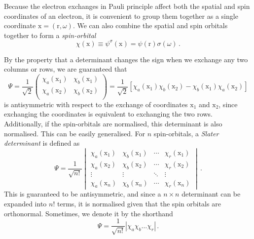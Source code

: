 \documentclass{article}
\theoremstyle{plain}\theoremheaderfont{\normalfont\itshape}\theorembodyfont{\rmfamily}\theoremseparator{.}\newtheorem*{rem}{Remark}\newtheorem*{ex}{Example}\newtheorem*{proof}{Proof}\newtheorem*{altp}{Alternative proof}
\theoremstyle{plain}\theoremheaderfont{\normalfont\bfseries}\theorembodyfont{\rmfamily}\theoremseparator{.}\newtheorem{thm}{Theorem}[section]\newtheorem{lem}[thm]{Lemma}\newtheorem{prop}[thm]{Proposition}\newtheorem*{cor}{Corollary}\newtheorem{defn}[thm]{Definition}\newtheorem{clm}[thm]{Claim}\newtheorem{clminproof}{Claim}\newtheorem{pos}{Postulate}[section]
\theoremstyle{break}\theoremheaderfont{\normalfont\itshape}\theorembodyfont{\rmfamily}\theoremseparator{.\medskip}\newtheorem*{proofskip}{Proof}\newtheorem*{exs}{Examples}\newtheorem*{rems}{Remarks}
\theoremstyle{break}\theoremheaderfont{\normalfont\bfseries}\theorembodyfont{\rmfamily}\theoremseparator{.\medskip}\newtheorem{lemskip}[thm]{Lemma}\newtheorem{defnskip}[thm]{Definition}\newtheorem{propskip}[thm]{Proposition}\newtheorem{thmskip}[thm]{Theorem}
\numberwithin{equation}{section}
\newcommand{\vb}[1]{\bm{\mathrm{#1}}}
\newcommand{\abs}[1]{\left| #1 \right|}
\begin{document}
    Because the electron exchanges in Pauli principle affect both the spatial and spin coordinates of an electron, it is convenient to group them together as a single coordinate \(\vb{x}=(\vb{r},\omega)\). We can also combine the spatial and spin orbitals together to form a \textit{spin-orbital}
    \begin{equation}
        \chi(\vb{x})\equiv\psi^{\sigma}(\vb{x})=\psi(\vb{r})\sigma(\omega)\,.
    \end{equation}

    By the property that a determinant changes the sign when we exchange any two columns or rows, we are guaranteed that
    \begin{equation}
        \Psi=\frac{1}{\sqrt{2}}\begin{pmatrix}
            \chi_a(\vb{x}_1) & \chi_b(\vb{x}_1) \\
            \chi_a(\vb{x}_2) & \chi_b(\vb{x}_2) \\
        \end{pmatrix}=\frac{1}{\sqrt{2}}[\chi_a(\vb{x}_1)\chi_b(\vb{x}_2)-\chi_b(\vb{x}_1)\chi_a(\vb{x}_2)]
    \end{equation}
    is antisymmetric with respect to the exchange of coordinates \(\vb{x}_1\) and \(\vb{x}_2\), since exchanging the coordinates is equivalent to exchanging the two rows. Additionally, if the spin-orbitals are normalised, this determinant is also normalised. This can be easily generalised. For \(n\) spin-orbitals, a \textit{Slater determinant} is defined as
    \begin{equation}
        \Psi=\frac{1}{\sqrt{n!}}\begin{vmatrix}
            \chi_a(\vb{x}_1) & \chi_b(\vb{x}_1) & \cdots & \chi_r(\vb{x}_1) \\
            \chi_a(\vb{x}_2) & \chi_b(\vb{x}_2) & \cdots & \chi_r(\vb{x}_2) \\
            \vdots & \vdots & \ddots & \vdots \\
            \chi_a(\vb{x}_n) & \chi_b(\vb{x}_n) & \cdots & \chi_r(\vb{x}_n)
        \end{vmatrix}\,.
    \end{equation}
    This is guaranteed to be antisymmetric, and since a \(n\times n\) determinant can be expanded into \(n!\) terms, it is normalised given that the spin orbitals are orthonormal. Sometimes, we denote it by the shorthand
    \begin{equation}
        \Psi=\frac{1}{\sqrt{n!}}\abs{\chi_a\chi_b\dots\chi_r}\,.
    \end{equation}
\end{document}
